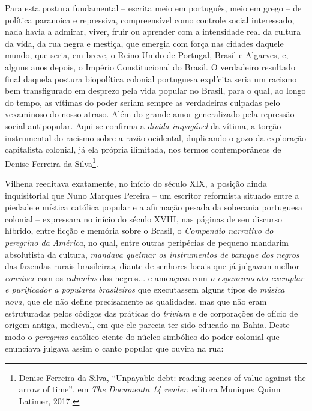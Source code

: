 Para esta postura fundamental -- escrita meio em português, meio em
grego -- de política paranoica e repressiva, compreensível como controle
social interessado, nada havia a admirar, viver, fruir ou aprender com a
intensidade real da cultura da vida, da rua negra e mestiça, que emergia
com força nas cidades daquele mundo, que seria, em breve, o Reino Unido
de Portugal, Brasil e Algarves, e, alguns anos depois, o Império
Constitucional do Brasil. O verdadeiro resultado final daquela postura
biopolítica colonial portuguesa explícita seria um racismo bem
transfigurado em desprezo pela vida popular no Brasil, para o qual, ao
longo do tempo, as vítimas do poder seriam sempre as verdadeiras
culpadas pelo vexaminoso do nosso atraso. Além do grande amor
generalizado pela repressão social antipopular. Aqui se confirma a
\emph{divida impagável} da vítima, a torção instrumental do racismo
sobre a razão ocidental, duplicando o gozo da exploração capitalista
colonial, já ela própria ilimitada, nos termos contemporâneos de Denise
Ferreira da Silva\footnote{Denise Ferreira da Silva, ``Unpayable debt:
  reading scenes of value against the arrow of time'', em \emph{The
  Documenta 14 reader}, editora Munique: Quinn Latimer, 2017.}.

Vilhena reeditava exatamente, no início do século XIX, a posição ainda
inquisitorial que Nuno Marques Pereira -- um escritor reformista situado
entre a piedade e mística católica popular e a afirmação pesada da
soberania portuguesa colonial -- expressara no início do século XVIII,
nas páginas de seu discurso híbrido, entre ficção e memória sobre o
Brasil, o \emph{Compendio narrativo do peregrino da América}, no qual,
entre outras peripécias de pequeno mandarim absolutista da cultura,
\emph{mandava queimar os instrumentos de batuque dos negros} das
fazendas rurais brasileira\emph{s}, diante de senhores locais que já
julgavam melhor \emph{conviver} com os \emph{calundus} dos negros... e
ameaçava com \emph{o espancamento exemplar e purificador a populares
brasileiros} que executassem alguns tipos de \emph{música nova}, que ele
não define precisamente as qualidades, mas que não eram estruturadas
pelos códigos das práticas do \emph{trivium} e de corporações de ofício
de origem antiga, medieval, em que ele parecia ter sido educado na
Bahia. Deste modo o \emph{peregrino} católico ciente do núcleo simbólico
do poder colonial que enunciava julgava assim o canto popular que ouvira
na rua:

